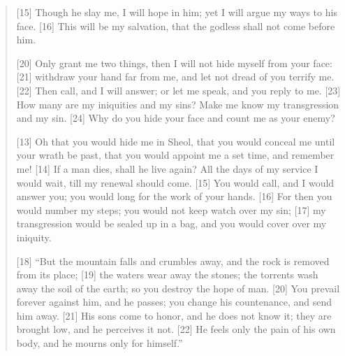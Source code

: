 \begin{quote}
    [15] Though he slay me, I will hope in him;
        yet I will argue my ways to his face.
    [16] This will be my salvation,
        that the godless shall not come before him.

    [20] Only grant me two things,
        then I will not hide myself from your face:
    [21] withdraw your hand far from me,
        and let not dread of you terrify me.
    [22] Then call, and I will answer;
        or let me speak, and you reply to me.
    [23] How many are my iniquities and my sins?
        Make me know my transgression and my sin.
    [24] Why do you hide your face
        and count me as your enemy?

    [13] Oh that you would hide me in Sheol,
        that you would conceal me until your wrath be past,
        that you would appoint me a set time, and remember me!
    [14] If a man dies, shall he live again?
        All the days of my service I would wait,
        till my renewal should come.
    [15] You would call, and I would answer you;
        you would long for the work of your hands.
    [16] For then you would number my steps;
        you would not keep watch over my sin;
    [17] my transgression would be sealed up in a bag,
        and you would cover over my iniquity.

    [18] “But the mountain falls and crumbles away,
        and the rock is removed from its place;
    [19] the waters wear away the stones;
        the torrents wash away the soil of the earth;
        so you destroy the hope of man.
    [20] You prevail forever against him, and he passes;
        you change his countenance, and send him away.
    [21] His sons come to honor, and he does not know it;
        they are brought low, and he perceives it not.
    [22] He feels only the pain of his own body,
        and he mourns only for himself.”
  \end{quote}
